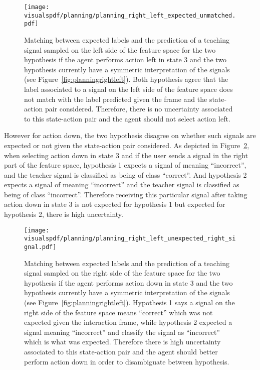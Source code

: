 \begin{figure}[!htbp]
  \centering
  \texttt{[image: \\visualspdf/planning/planning\_right\_left\_expected\_unmatched.pdf]}
  \caption{Matching between expected labels and the prediction of a teaching signal sampled on the left side of the feature space for the two hypothesis if the agent performs action left in state 3 and the two hypothesis currently have a symmetric interpretation of the signals (see Figure~\ref{fig:planningrightleft}). Both hypothesis agree that the label associated to a signal on the left side of the feature space does not match with the label predicted given the frame and the state-action pair considered. Therefore, there is no uncertainty associated to this state-action pair and the agent should not select action left.}
  \label{fig:uncertaintymeaningrightleftexpectedright}
\end{figure}

However for action down, the two hypothesis disagree on whether such signals are expected or not given the state-action pair considered. As depicted in Figure~\ref{fig:uncertaintymeaningrightleftunexpectedright}, when selecting action down in state 3 and if the user sends a signal in the right part of the feature space, hypothesis 1 expects a signal of meaning ``incorrect'', and the teacher signal is classified as being of class ``correct''. And hypothesis 2 expects a signal of meaning ``incorrect'' and the teacher signal is classified as being of class ``incorrect''. Therefore receiving this particular signal after taking action down in state 3 is not expected for hypothesis 1 but expected for hypothesis 2, there is high uncertainty.

\begin{figure}[!htbp]
  \centering
  \texttt{[image: \\visualspdf/planning/planning\_right\_left\_unexpected\_right\_signal.pdf]}
  \caption{Matching between expected labels and the prediction of a teaching signal sampled on the right side of the feature space for the two hypothesis if the agent performs action down in state 3 and the two hypothesis currently have a symmetric interpretation of the signals (see Figure~\ref{fig:planningrightleft}). Hypothesis 1 says a signal on the right side of the feature space means ``correct'' which was not expected given the interaction frame, while hypothesis 2 expected a signal meaning ``incorrect'' and classify the signal as ``incorrect'' which is what was expected. Therefore there is high uncertainty associated to this state-action pair and the agent should better perform action down in order to disambiguate between hypothesis.}
  \label{fig:uncertaintymeaningrightleftunexpectedright}
\end{figure}

